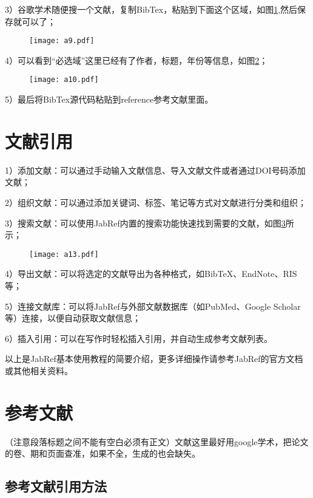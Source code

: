 \documentclass{standalone}
\begin{document}
3）谷歌学术随便搜一个文献，复制BibTex，粘贴到下面这个区域，如图\ref{fig_8},然后保存就可以了；
\begin{figure}[htbp]
	\centering
	\texttt{[image: a9.pdf]}
	\label{fig_8}
\end{figure}

4）可以看到“必选域”这里已经有了作者，标题，年份等信息，如图\ref{fig_9}；
\begin{figure}[htbp]
	\centering
	\texttt{[image: a10.pdf]}
	\label{fig_9}
\end{figure}

5）最后将BibTex源代码粘贴到reference参考文献里面。


\section{文献引用}

1）添加文献：可以通过手动输入文献信息、导入文献文件或者通过DOI号码添加文献；

2）组织文献：可以通过添加关键词、标签、笔记等方式对文献进行分类和组织；

3）搜索文献：可以使用JabRef内置的搜索功能快速找到需要的文献，如图\ref{fig_10}所示；
	\begin{figure}[htbp]
		\centering
		\texttt{[image: a13.pdf]}
		\label{fig_10}
	\end{figure}
	
4）导出文献：可以将选定的文献导出为各种格式，如BibTeX、EndNote、RIS等；

5）连接文献库：可以将JabRef与外部文献数据库（如PubMed、Google Scholar等）连接，以便自动获取文献信息；

6）插入引用：可以在写作时轻松插入引用，并自动生成参考文献列表。

以上是JabRef基本使用教程的简要介绍，更多详细操作请参考JabRef的官方文档或其他相关资料。

\section{参考文献}

（注意段落标题之间不能有空白必须有正文）文献这里最好用google学术，把论文的卷、期和页面查准，如果不全，生成的也会缺失。

\subsection{参考文献引用方法}
\end{document}
